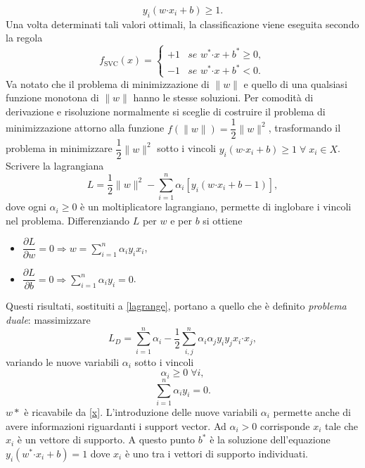 \documentclass [11pt,a4paper,twoside,openright] {book}
\begin{document}
\[
y_i(w\boldsymbol{\cdot}x_i + b) \geq 1.
\]
Una volta determinati tali valori ottimali, la classificazione viene eseguita secondo la regola
\[
f_\mathrm{SVC}(x)=
\begin{cases}
+1 & \textit{se } w^* \boldsymbol{\cdot} x + b^* \geq 0, \\
-1 & \textit{se } w^* \boldsymbol{\cdot} x  + b^*< 0.
\end{cases}
\]
Va notato che il problema di minimizzazione di $\parallel w \parallel$ e quello di una qualsiasi funzione monotona di $\parallel w \parallel$ hanno le stesse soluzioni. Per comodità di derivazione e risoluzione normalmente si sceglie di costruire il problema di minimizzazione attorno alla funzione $f(\parallel w \parallel) = \dfrac{1}{2}\parallel w \parallel ^2$, trasformando il problema in minimizzare $\dfrac{1}{2}\parallel w \parallel ^2$ sotto i vincoli $ y_i(w\boldsymbol{\cdot}x_i + b) \geq 1 \; \forall \; x_i \in X$. Scrivere la lagrangiana
\[
L = \dfrac{1}{2}\parallel w\parallel ^2 - \sum_{i=1}^n \alpha_i [y_i(w \boldsymbol{\cdot} x_i +b -1)],
\]dove ogni $\alpha_i \geq 0$ è un moltiplicatore lagrangiano, permette di inglobare i vincoli nel problema. Differenziando $L$ per $w$ e per $b$ si ottiene
\begin{itemize}
\item[]$\dfrac{\partial L}{\partial w} = 0 \Longrightarrow w = \sum_{i=1}^n \alpha_i y_i x_i$,
\item[]$\dfrac{\partial L}{\partial b} = 0 \Longrightarrow \sum_{i=1}^n \alpha_i y_i = 0$.
\end{itemize}
Questi risultati, sostituiti a \ref{lagrange}, portano a quello che è definito \textit{problema duale}\cite{Fletcher}: massimizzare
\[
L_D = \sum_{i=1}^n \alpha_i -\dfrac{1}{2} \sum_{i,j}^n \alpha_i \alpha_j y_i y_j x_i \boldsymbol{\cdot} x_j,
\]
variando le nuove variabili $\alpha_i$ sotto i vincoli
\[
\alpha_i \geq 0 \; \forall i,
\]
\[
\sum_{i=1}^n \alpha_i y_i = 0.
\]
$w*$ è ricavabile da \ref{x}. L'introduzione delle nuove variabili $\alpha_i$ permette anche di avere informazioni riguardanti i support vector. Ad $\alpha_i > 0$ corrisponde $x_i$ tale che $x_i$ è un vettore di supporto. A questo punto $b^*$ è la soluzione dell'equazione $y_i(w^* \boldsymbol{\cdot} x_i + b)= 1$ dove $x_i$ è uno tra i vettori di supporto individuati. 
\end{document}
